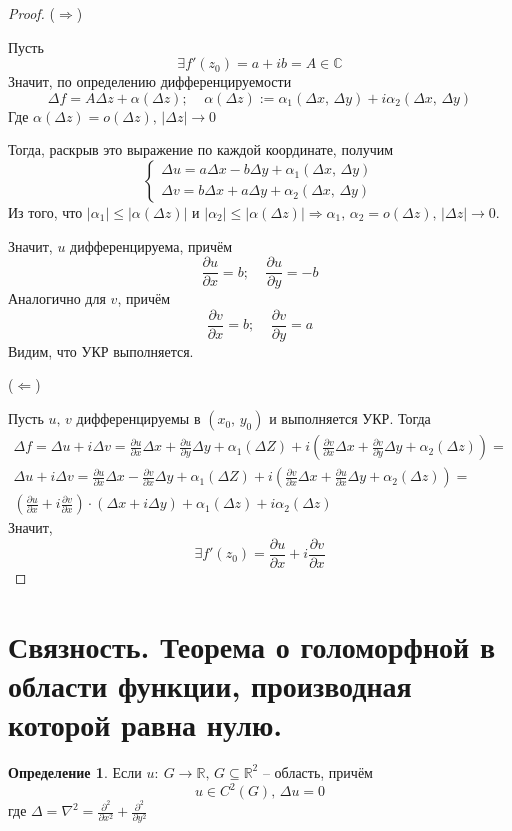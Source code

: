 \documentclass[a4paper,12pt]{article}
\renewcommand{\leq}{\ensuremath{\leqslant}}
\theoremstyle{plain}
\theoremstyle{definition}
\newtheorem{definition}{Определение}[section]
\theoremstyle{remark}
\begin{document}
\begin{proof}
	($\Rightarrow$)

	Пусть
	\[
		\exists f'(z_0) = a + ib = A \in \mathbb{C}
	\]
	Значит, по определению дифференцируемости
	\[
		\Delta f = A\Delta z + \alpha(\Delta z);\;\;\;\; \alpha(\Delta z) := \alpha_1(\Delta x,\, \Delta y) + i\alpha_2(\Delta x,\, \Delta y)
	\]
	Где $\alpha(\Delta z) = o(\Delta z),\, \vert\Delta z\vert \to 0$

	Тогда, раскрыв это выражение по каждой координате, получим
	\[
		\begin{cases}
			\Delta u = a\Delta x - b\Delta y + \alpha_1(\Delta x,\, \Delta y) \\
			\Delta v = b\Delta x + a \Delta y + \alpha_2(\Delta x,\, \Delta y)
		\end{cases}
	\]
	Из того, что $\vert\alpha_1\vert \leq \vert \alpha(\Delta z)\vert$ и $\vert\alpha_2\vert \leq \vert \alpha(\Delta z)\vert \Rightarrow \alpha_1,\, \alpha_2 = o(\Delta z),\, \vert \Delta z\vert \to 0$.

	Значит, $u$ дифференцируема, причём
	\[
		\frac{\partial u}{\partial x} = b ;\;\;\;\; \frac{\partial u}{\partial y} = -b
	\]
	Аналогично для $v$, причём
	\[
		\frac{\partial v}{\partial x} = b ;\;\;\;\; \frac{\partial v}{\partial y} = a
	\]
	Видим, что УКР выполняется.

	($\Leftarrow$)

	Пусть $u,\, v$ дифференцируемы в $(x_0,\, y_0)$ и выполняется УКР. Тогда
	\begin{align*}
		\Delta f = \Delta u + i\Delta v = \frac{\partial u}{\partial x}\Delta x + \frac{\partial u}{\partial y}\Delta y + \alpha_1(\Delta Z) + i\left(\frac{\partial v}{\partial x}\Delta x + \frac{\partial v}{\partial y}\Delta y + \alpha_2(\Delta z)\right) = \\
		\Delta u + i\Delta v = \frac{\partial u}{\partial x}\Delta x - \frac{\partial v}{\partial x}\Delta y + \alpha_1(\Delta Z) + i\left(\frac{\partial v}{\partial x}\Delta x + \frac{\partial u}{\partial x}\Delta y + \alpha_2(\Delta z)\right) =            \\
		\left(\frac{\partial u}{\partial x} + i\frac{\partial v}{\partial x}\right)\cdot(\Delta x + i\Delta y) + \alpha_1(\Delta z) + i\alpha_2(\Delta z)
	\end{align*}
	Значит,
	\[
		\exists f'(z_0) = \frac{\partial u}{\partial x} +i\frac{\partial v}{\partial x}
	\]
\end{proof}

\section{Связность. Теорема о голоморфной в области функции, производная которой равна нулю.}
\begin{definition}
	Если $u :\: G \to \mathbb{R},\, G \subseteq \mathbb{R}^2$ -- область, причём
	\[
		u \in C^2(G),\, \Delta u = 0
	\]
	где $\Delta = \nabla^2 = \frac{\partial^2}{\partial x^2} + \frac{\partial^2}{\partial y^2}$
\end{definition}
\end{document}
